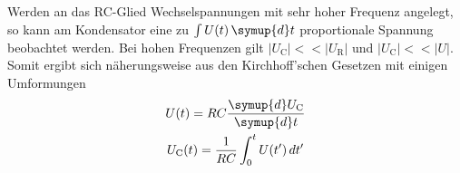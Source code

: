 Werden an das RC-Glied Wechselspannungen mit sehr hoher Frequenz angelegt, so kann
am Kondensator eine zu $\int U(t)\,\symup{d}t$ proportionale Spannung beobachtet werden.
Bei hohen Frequenzen gilt $\lvert U_{\text{C}} \rvert << \lvert U_{\text{R}} \rvert$
und $\lvert U_{\text{C}} \rvert << \lvert U \rvert$. Somit ergibt sich näherungsweise
aus den Kirchhoff'schen Gesetzen mit einigen Umformungen
\begin{gather}
  U(t)= R C \frac{\symup{d}U_{\text{C}}}{\symup{d}t} \\
  U_{\text{C}}(t)=\frac{1}{RC}\int_0^t U(t')\, dt'
\end{gather}



\label{sec:Theorie}
